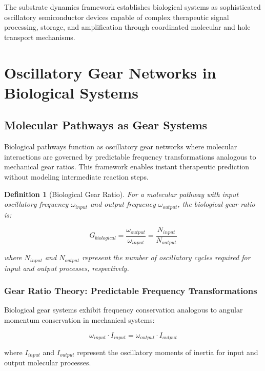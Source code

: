\documentclass[12pt,a4paper]{article}
\newtheorem{definition}{Definition}[section]
\begin{document}
The substrate dynamics framework establishes biological systems as sophisticated oscillatory semiconductor devices capable of complex therapeutic signal processing, storage, and amplification through coordinated molecular and hole transport mechanisms.

\section{Oscillatory Gear Networks in Biological Systems}

\subsection{Molecular Pathways as Gear Systems}

Biological pathways function as oscillatory gear networks where molecular interactions are governed by predictable frequency transformations analogous to mechanical gear ratios. This framework enables instant therapeutic prediction without modeling intermediate reaction steps.

\begin{definition}[Biological Gear Ratio]
For a molecular pathway with input oscillatory frequency $\omega_{input}$ and output frequency $\omega_{output}$, the biological gear ratio is:

\begin{equation}
G_{biological} = \frac{\omega_{output}}{\omega_{input}} = \frac{N_{input}}{N_{output}}
\end{equation}

where $N_{input}$ and $N_{output}$ represent the number of oscillatory cycles required for input and output processes, respectively.
\end{definition}

\subsubsection{Gear Ratio Theory: Predictable Frequency Transformations}

Biological gear systems exhibit frequency conservation analogous to angular momentum conservation in mechanical systems:

\begin{equation}
\omega_{input} \cdot I_{input} = \omega_{output} \cdot I_{output}
\end{equation}

where $I_{input}$ and $I_{output}$ represent the oscillatory moments of inertia for input and output molecular processes.
\end{document}
